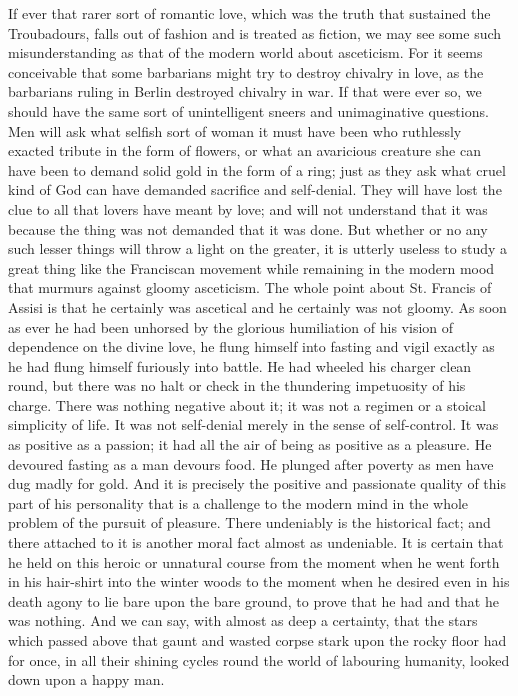 \documentclass{book}
\begin{document}
If ever that rarer sort of romantic love, which was the truth that sustained the Troubadours, falls out of fashion and is treated as fiction, we may see some such misunderstanding as that of the modern world about asceticism. For it seems conceivable that some barbarians might try to destroy chivalry in love, as the barbarians ruling in Berlin destroyed chivalry in war. If that were ever so, we should have the same sort of unintelligent sneers and unimaginative questions. Men will ask what selfish sort of woman it must have been who ruthlessly exacted tribute in the form of flowers, or what an avaricious creature she can have been to demand solid gold in the form of a ring; just as they ask what cruel kind of God can have demanded sacrifice and self-denial. They will have lost the clue to all that lovers have meant by love; and will not understand that it was because the thing was not demanded that it was done. But whether or no any such lesser things will throw a light on the greater, it is utterly useless to study a great thing like the Franciscan movement while remaining in the modern mood that murmurs against gloomy asceticism. The whole point about St. Francis of Assisi is that he certainly was ascetical and he certainly was not gloomy. As soon as ever he had been unhorsed by the glorious humiliation of his vision of dependence on the divine love, he flung himself into fasting and vigil exactly as he had flung himself furiously into battle. He had wheeled his charger clean round, but there was no halt or check in the thundering impetuosity of his charge. There was nothing negative about it; it was not a regimen or a stoical simplicity of life. It was not self-denial merely in the sense of self-control. It was as positive as a passion; it had all the air of being as positive as a pleasure. He devoured fasting as a man devours food. He plunged after poverty as men have dug madly for gold. And it is precisely the positive and passionate quality of this part of his personality that is a challenge to the modern mind in the whole problem of the pursuit of pleasure. There undeniably is the historical fact; and there attached to it is another moral fact almost as undeniable. It is certain that he held on this heroic or unnatural course from the moment when he went forth in his hair-shirt into the winter woods to the moment when he desired even in his death agony to lie bare upon the bare ground, to prove that he had and that he was nothing. And we can say, with almost as deep a certainty, that the stars which passed above that gaunt and wasted corpse stark upon the rocky floor had for once, in all their shining cycles round the world of labouring humanity, looked down upon a happy man.
\end{document}
